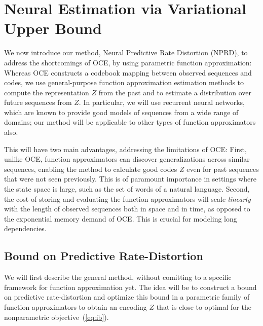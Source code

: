 \documentclass[11pt,letterpaper]{article}
\begin{document}
\section{Neural Estimation via Variational Upper Bound}

We now introduce our method, Neural Predictive Rate Distortion (NPRD), to address the shortcomings of OCE, by using parametric function approximation:
Whereas OCE constructs a codebook mapping between observed sequences and codes, we use general-purpose function approximation estimation methods to compute the representation $Z$ from the past and to estimate a distribution over future sequences from $Z$.
In particular, we will use recurrent neural networks, which are known to provide good models of sequences from a wide range of domains; our method will be applicable to other types of function approximators also.

This will have two main advantages, addressing the limitations of OCE:
First, unlike OCE, function approximators can discover generalizations across similar sequences, enabling the method to calculate good codes $Z$ even for past sequences that were not seen previously.
This is of paramount importance in settings where the state space is large, such as the set of words of a natural language.
Second, the cost of storing and evaluating the function approximators will scale \emph{linearly} with the length of observed sequences both in space and in time, as opposed to the exponential memory demand of OCE.
This is crucial for modeling long dependencies.



\subsection{Bound on Predictive Rate-Distortion}
We will first describe the general method, without comitting to a specific framework for function approximation yet.
The idea will be to construct a bound on predictive rate-distortion and optimize this bound in a parametric family of function approximators to obtain an encoding $Z$ that is close to optimal for the nonparametric objective~(\ref{eq:ib}).
\end{document}
